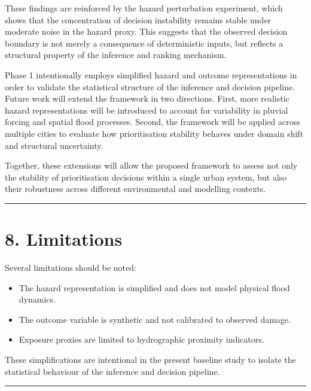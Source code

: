 \documentclass[
]{article}
\providecommand{\tightlist}{%
  \setlength{\itemsep}{0pt}\setlength{\parskip}{0pt}}
\begin{document}
These findings are reinforced by the hazard perturbation experiment,
which shows that the concentration of decision instability remains
stable under moderate noise in the hazard proxy. This suggests that the
observed decision boundary is not merely a consequence of deterministic
inputs, but reflects a structural property of the inference and ranking
mechanism.

Phase 1 intentionally employs simplified hazard and outcome
representations in order to validate the statistical structure of the
inference and decision pipeline. Future work will extend the framework
in two directions. First, more realistic hazard representations will be
introduced to account for variability in pluvial forcing and spatial
flood processes. Second, the framework will be applied across multiple
cities to evaluate how prioritisation stability behaves under domain
shift and structural uncertainty.

Together, these extensions will allow the proposed framework to assess
not only the stability of prioritisation decisions within a single urban
system, but also their robustness across different environmental and
modelling contexts.

\begin{center}\rule{0.5\linewidth}{0.5pt}\end{center}

\section{8. Limitations}\label{limitations}

Several limitations should be noted:

\begin{itemize}
\tightlist
\item
  The hazard representation is simplified and does not model physical
  flood dynamics.
\item
  The outcome variable is synthetic and not calibrated to observed
  damage.
\item
  Exposure proxies are limited to hydrographic proximity indicators.
\end{itemize}

These simplifications are intentional in the present baseline study to
isolate the statistical behaviour of the inference and decision
pipeline.

\begin{center}\rule{0.5\linewidth}{0.5pt}\end{center}
\end{document}
